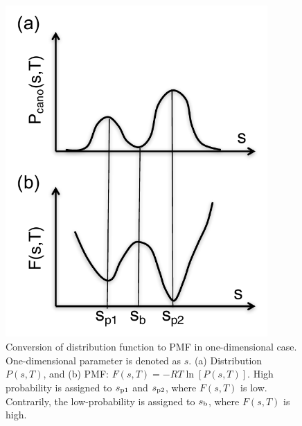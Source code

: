 \begin{figure}
  \centering
  \includegraphics[width=10cm]{../enhance_rev/figures/pmf_pic.pdf}
  \caption{\label{fig:pmf_pic.pdf} Conversion of distribution function to PMF in one-dimensional case. One-dimensional parameter is denoted as $s$. (a) Distribution $P(s,T)$, and (b) PMF: $F(s,T)=-RT \ln[P(s,T)]$. High probability is assigned to $s_{\rm p1}$ and $s_{\rm p2}$, where $F(s,T)$ is low. Contrarily, the low-probability is assigned to $s_{\rm b}$, where $F(s,T)$ is high.}
\end{figure}

